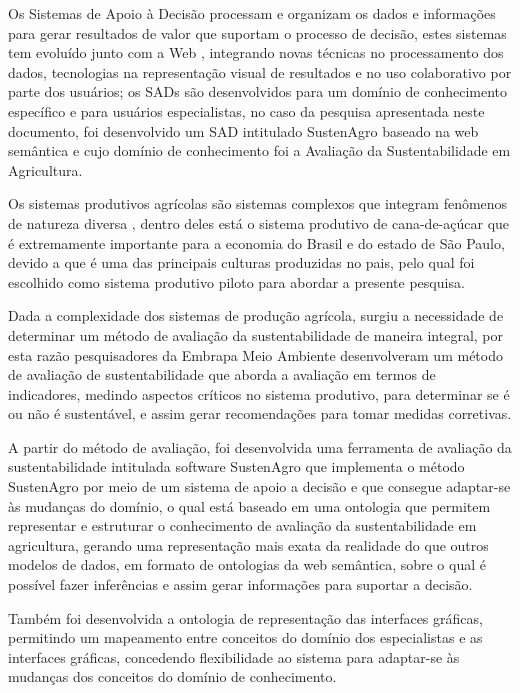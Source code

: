 Os Sistemas de Apoio à Decisão 
processam e organizam os dados e informações para gerar resultados
de valor que suportam o processo de decisão, estes sistemas tem evoluído
junto com a Web \citet{Shim2002}, integrando novas técnicas no processamento
dos dados, tecnologias na representação visual de resultados e no
uso colaborativo por parte dos usuários; os SADs são desenvolvidos
para um domínio de conhecimento específico e para usuários especialistas,
no caso da pesquisa apresentada neste documento, foi desenvolvido
um SAD intitulado SustenAgro baseado na web semântica e cujo domínio
de conhecimento foi a Avaliação da Sustentabilidade em Agricultura.

Os sistemas produtivos agrícolas são sistemas complexos que integram
fenômenos de natureza diversa \citep{simon1991architecture}, dentro
deles está o sistema produtivo de cana-de-açúcar que é extremamente
importante para a economia do Brasil e do estado de São Paulo, devido
a que é uma das principais culturas produzidas no pais\citet{Storquato2015},
pelo qual foi escolhido como sistema produtivo piloto para abordar
a presente pesquisa.

Dada a complexidade dos sistemas de produção agrícola, surgiu a necessidade
de determinar um método de avaliação da sustentabilidade de maneira
integral\citet{Singh2012281}, por esta razão pesquisadores da Embrapa
Meio Ambiente desenvolveram um método de avaliação de sustentabilidade
que aborda a avaliação em termos de indicadores, medindo aspectos
críticos no sistema produtivo, para determinar se é ou não é sustentável,
e assim gerar recomendações para tomar medidas corretivas.

A partir do método de avaliação, foi desenvolvida uma ferramenta de
avaliação da sustentabilidade intitulada software SustenAgro que implementa
o método SustenAgro por meio de um sistema de apoio a decisão e que
consegue adaptar-se às mudanças do domínio, o qual está baseado em
uma ontologia que permitem representar e estruturar o conhecimento
de avaliação da sustentabilidade em agricultura, gerando uma representação
mais exata da realidade do que outros modelos de dados, em formato
de ontologias da web semântica, sobre o qual é possível fazer inferências
e assim gerar informações para suportar a decisão.

Também foi desenvolvida a ontologia de representação das interfaces
gráficas, permitindo um mapeamento entre conceitos do domínio dos
especialistas e as interfaces gráficas, concedendo flexibilidade ao
sistema para adaptar-se às mudanças dos conceitos do domínio de conhecimento.

